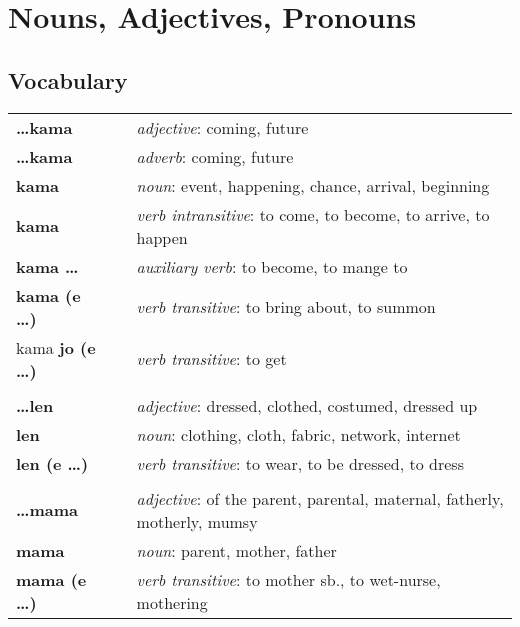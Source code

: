 \section{Nouns, Adjectives, Pronouns}
%
\subsection*{Vocabulary}
\begin{supertabular}{p{2,5cm}|ll}
%
\textbf{\dots kama} && \textit{adjective}: coming, future \\ %
\textbf{\dots kama} && \textit{adverb}: coming, future \\ %
\textbf{kama} && \textit{noun}: event, happening, chance, arrival, beginning \\ %
\textbf{kama} && \textit{verb intransitive}: to come, to become, to arrive, to happen \\ %
\textbf{kama \dots} && \textit{auxiliary verb}: to become, to mange to \\ %
\textbf{kama (e \dots)} && \textit{verb transitive}: to bring about, to summon \\ %
kama \textbf{jo (e \dots)} && \textit{verb transitive}: to get \\ %
 && \\ %
%
\textbf{\dots len} && \textit{adjective}: dressed, clothed, costumed, dressed up \\ %
\textbf{len} && \textit{noun}: clothing, cloth, fabric, network, internet \\ %
\textbf{len (e \dots)} && \textit{verb transitive}: to wear, to be dressed, to dress \\ %
 && \\ %
%
\textbf{\dots mama} && \textit{adjective}: of the parent, parental, maternal, fatherly, motherly, mumsy \\ %
\textbf{mama} && \textit{noun}: parent, mother, father \\ %
\textbf{mama (e \dots)} && \textit{verb transitive}: to mother sb., to wet-nurse, mothering \\ %

\end{supertabular}
